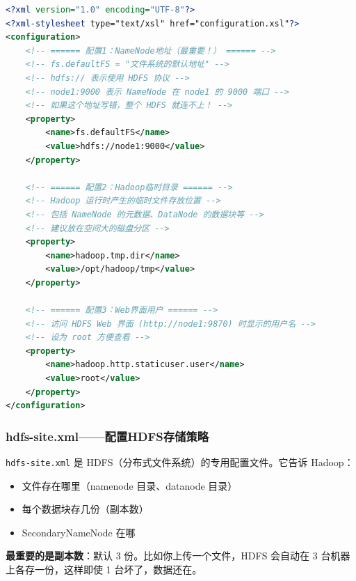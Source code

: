 \documentclass[12pt,a4paper]{article}
\begin{document}
\begin{lstlisting}[language=XML]
<?xml version="1.0" encoding="UTF-8"?>
<?xml-stylesheet type="text/xsl" href="configuration.xsl"?>
<configuration>
    <!-- ====== 配置1：NameNode地址（最重要！） ====== -->
    <!-- fs.defaultFS = "文件系统的默认地址" -->
    <!-- hdfs:// 表示使用 HDFS 协议 -->
    <!-- node1:9000 表示 NameNode 在 node1 的 9000 端口 -->
    <!-- 如果这个地址写错，整个 HDFS 就连不上！ -->
    <property>
        <name>fs.defaultFS</name>
        <value>hdfs://node1:9000</value>
    </property>
    
    <!-- ====== 配置2：Hadoop临时目录 ====== -->
    <!-- Hadoop 运行时产生的临时文件存放位置 -->
    <!-- 包括 NameNode 的元数据、DataNode 的数据块等 -->
    <!-- 建议放在空间大的磁盘分区 -->
    <property>
        <name>hadoop.tmp.dir</name>
        <value>/opt/hadoop/tmp</value>
    </property>
    
    <!-- ====== 配置3：Web界面用户 ====== -->
    <!-- 访问 HDFS Web 界面 (http://node1:9870) 时显示的用户名 -->
    <!-- 设为 root 方便查看 -->
    <property>
        <name>hadoop.http.staticuser.user</name>
        <value>root</value>
    </property>
</configuration>
\end{lstlisting}

\subsubsection{hdfs-site.xml——配置HDFS存储策略}

\begin{knowledgebox}[这个文件是干什么的？]
\texttt{hdfs-site.xml} 是 HDFS（分布式文件系统）的专用配置文件。它告诉 Hadoop：

\begin{itemize}
    \item 文件存在哪里（namenode 目录、datanode 目录）
    \item 每个数据块存几份（副本数）
    \item SecondaryNameNode 在哪
\end{itemize}

\textbf{最重要的是副本数}：默认 3 份。比如你上传一个文件，HDFS 会自动在 3 台机器上各存一份，这样即使 1 台坏了，数据还在。
\end{knowledgebox}
\end{document}
